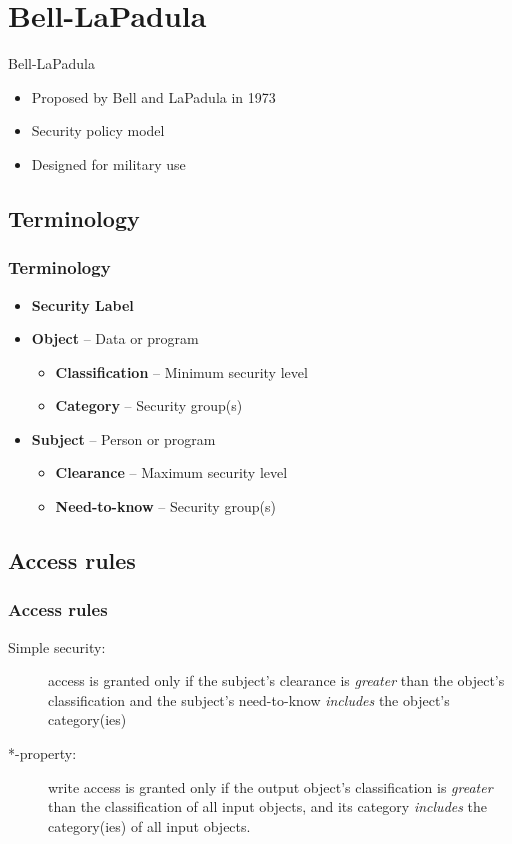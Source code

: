 \documentclass[10pt]{beamer}
\begin{document}

\section{Bell-LaPadula}

\begin{frame}{Bell-LaPadula}{}
	\begin{itemize}
		\item Proposed by Bell and LaPadula in 1973
		\item Security policy model
		\item Designed for military use
	\end{itemize}
\end{frame}

\subsection{Terminology}
\begin{frame}
	\frametitle{Terminology}
	
	\begin{itemize}
		\item \textbf{Security Label}
		\item \textbf{Object} -- Data or program
			\begin{itemize}
				\item \textbf{Classification} -- Minimum security level
				\item \textbf{Category} -- Security group(s)
			\end{itemize}
		\item \textbf{Subject} -- Person or program
			\begin{itemize}
				\item \textbf{Clearance} -- Maximum security level
				\item \textbf{Need-to-know} -- Security group(s)
			\end{itemize}
	\end{itemize}
\end{frame}

\subsection{Access rules}
\begin{frame}
	\frametitle{Access rules}
	
	\begin{description}
		\item[Simple security:] access is granted only if the subject's clearance is \textit{greater} than the object's classification and the subject's need-to-know \textit{includes} the object's category(ies)
		\item[*-property:] write access is granted only if the output object's classification is \textit{greater} than the classification of all input objects, and its category \textit{includes} the category(ies) of all input objects.
	\end{description}
\end{frame}
\end{document}
